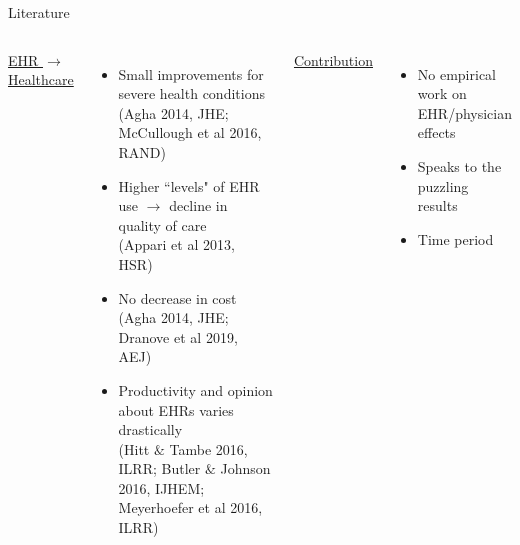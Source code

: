 \documentclass[10pt]{beamer}
\begin{document}
\begin{frame}{Literature}
\small
\begin{columns}
\setlength{\tabcolsep}{-5pt}
        \centering
        \underline{ EHR $\rightarrow$ Healthcare }
        \vspace{-1mm}
        \begin{itemize}
            \item Small improvements for severe health conditions \\ \vspace{1mm}
            \tiny(Agha 2014, JHE; McCullough et al 2016, RAND)
            
            \footnotesize
            
            \item Higher ``levels" of EHR use $\rightarrow$ decline in quality of care\\ \vspace{1mm}
            \tiny (Appari et al 2013, HSR)
            
            \footnotesize 
            
            \item No decrease in cost \\ \vspace{1mm}
            \tiny (Agha 2014, JHE; Dranove et al 2019, AEJ) 
            
            \footnotesize
            
            \item Productivity and opinion about EHRs varies drastically \\ \vspace{1mm}
            \tiny (Hitt $\&$ Tambe 2016, ILRR; Butler $\&$ Johnson 2016, IJHEM; Meyerhoefer et al 2016, ILRR)
        \end{itemize}
        
        \pause
        
        \centering
        \color{blue}
        \underline{ Contribution }
        \vspace{1mm}
        \begin{itemize}
        \color{blue}
            \item No empirical work on EHR/physician effects
            \item Speaks to the puzzling results
            \item Time period 
        \end{itemize}
        
        
\end{columns}

\end{frame}
\end{document}

